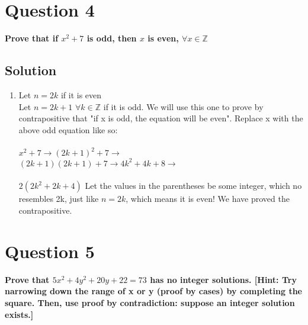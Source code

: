 \documentclass[11pt]{article}
\begin{document}
\clearpage
\section*{Question 4}
    \textbf{Prove that if \(x^2 +7\) is odd, then \(x\) is even, \(\forall x \in \mathbb{Z}\)}
    \subsection*{Solution}
    \begin{enumerate}[label=(\alph*)]
        \item[] Let \(n = 2k\) if it is even \\
        Let \(n= 2k+1\) \(\forall k \in \mathbb{Z}\) if it is odd. We will use this one to prove by contrapositive that "if x is odd, the equation will be even". 
        Replace x with the above odd equation like so: \\ \\\(x^2 + 7 \rightarrow (2k+1)^2 + 7 \rightarrow\) \\
        \((2k+1)(2k+1) + 7 \rightarrow 4k^2+4k+8 \rightarrow\) \\ \\
        \(2(2k^2 + 2k+4)\) Let the values in the parentheses be some integer, which no resembles 2k, just like \(n=2k\), which means it is even! We have proved the contrapositive.
    \end{enumerate}

\clearpage
\section*{Question 5}
    \textbf{Prove that \(5x^2 +4y^2+20y+22=73\) has no integer solutions. [Hint: Try narrowing down the range of x or y (proof by cases) by completing the square.
Then, use proof by contradiction: suppose an integer solution exists.]}
\end{document}
